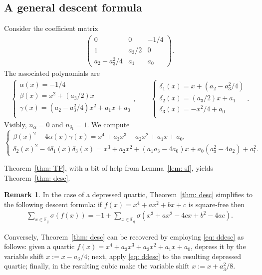 \documentclass[11pt]{amsart}
\newcommand{\F}{\mathbb{F}}
\newcommand{\Fq}{\F_{\!q}}
\theoremstyle{definition}
\newtheorem{rem}{Remark}[section]
\begin{document}
\subsection{A general descent formula}
Consider the coefficient matrix 
\begin{align*}
\begin{pmatrix}
0 & 0 & -1/4\\
1 & a_3/2 & 0\\
a_2-a_3^2/4 & a_1 &a_0
\end{pmatrix}.
\end{align*}
The associated polynomials are
\begin{align*}
\begin{cases}
\alpha(x)=-1/4\\
\beta(x)=x^2+(a_3/2)x\\
\gamma(x)=(a_2-a_3^2/4)x^2+a_1x+a_0\\
\end{cases},\qquad 
\begin{cases}
\delta_1(x)=x+(a_2-a_3^2/4)\\
\delta_2(x)=(a_3/2)x+a_1\\
\delta_3(x)=-x^2/4+a_0\\
\end{cases}.
\end{align*}
Visibly, $n_\alpha=0$ and $n_{\delta_1}=1$. We compute
\[
\begin{cases}
\beta(x)^2-4\alpha(x)\gamma(x)=x^4+a_3x^3+a_2x^2+a_1x+a_0,\\
\delta_2(x)^2-4\delta_1(x)\delta_3(x)=x^3+a_2x^2+(a_1a_3-4a_0)x+a_0(a_3^2-4a_2)+a_1^2.
\end{cases}
\]

Theorem~\ref{thm: TF}, with a bit of help from Lemma~\ref{lem: sf}, yields Theorem~\ref{thm: desc}.

\begin{rem}
In the case of a depressed quartic, Theorem~\ref{thm: desc} simplifies to the following descent formula: if $f(x)=x^4+ax^2+bx+c$ is square-free then
\begin{align}\label{eq: ddesc}
\sum_{x\in \Fq} \sigma(f(x))=-1+\sum_{x\in \Fq} \sigma(x^3+ax^2-4cx+b^2-4ac).
\end{align}


Conversely, Theorem~\ref{thm: desc} can be recovered by employing \eqref{eq: ddesc} as follows: given a quartic $f(x)=x^4+a_3x^3+a_2x^2+a_1x+a_0$, depress it by the variable shift $x:=x-a_3/4$; next, apply \eqref{eq: ddesc} to the resulting depressed quartic; finally, in the resulting cubic make the variable shift $x:=x+a_3^2/8$.
\end{rem}
\end{document}
